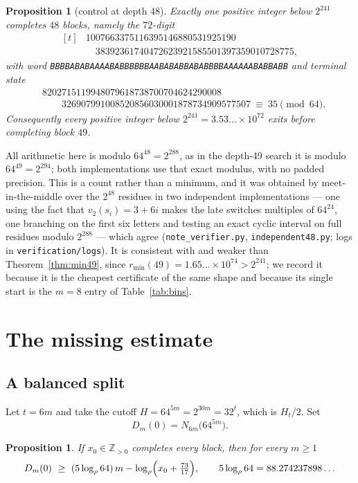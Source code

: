 \documentclass[11pt,a4paper]{article}
\theoremstyle{plain}
\newtheorem{proposition}[theorem]{Proposition}
\theoremstyle{definition}
\theoremstyle{remark}
\newcommand{\Zpos}{\mathbb{Z}_{>0}}
\begin{document}
\begin{proposition}[control at depth 48]\label{prop:48}
Exactly one positive integer below $2^{241}$ completes $48$ blocks, namely the
$72$-digit
\[
\begin{aligned}[t]
&1007663375116395146880531925190\\
&\quad 38392361740472623921585501397359010728775,
\end{aligned}
\]
with word \texttt{BBBBABABAAAABABBBBBBAABABABBABABBBBAAAAAABABBABB} and
terminal state
\begin{align*}
&8202715119948079618738700704624290008\\
&\qquad 326907991008520856030001878734909577507\ \equiv\ 35\pmod{64}.
\end{align*}
Consequently every positive integer below
$2^{241}=3.53\ldots\times 10^{72}$ exits before completing block $49$.
\end{proposition}

All arithmetic here is modulo $64^{48}=2^{288}$, as in the depth-49 search it
is modulo $64^{49}=2^{294}$; both implementations use that exact modulus, with
no padded precision. This is a count rather than a minimum, and it was obtained
by meet-in-the-middle over the $2^{48}$ residues in two independent
implementations --- one using the
fact that $v_2(s_i)=3+6i$ makes the late switches multiples of $64^{24}$, one
branching on the first six letters and testing an exact cyclic interval on full
residues modulo $2^{288}$ --- which agree (\texttt{note\_verifier.py},
\texttt{independent48.py}; logs in \texttt{verification/logs}). It is
consistent with and weaker than Theorem~\ref{thm:min49}, since
$r_{\min}(49)=1.65\ldots\times 10^{74}>2^{241}$; we record it because it is the
cheapest certificate of the same shape and because its single start is the
$m=8$ entry of Table~\ref{tab:bins}.

\section{The missing estimate}

\subsection{A balanced split}

Let $t=6m$ and take the cutoff $H=64^{5m}=2^{30m}=32^{t}$, which is $H_t/2$.
Set
\[
D_m(0)=N_{6m}\bigl(64^{5m}\bigr).
\]

\begin{proposition}\label{prop:nec}
If $x_0\in\Zpos$ completes every block, then for every $m\ge 1$
\begin{equation}\label{eq:nec}
D_m(0)\ \ge\ (5\log_\rho 64)\,m-\log_\rho\Bigl(x_0+\tfrac{73}{17}\Bigr),
\qquad 5\log_\rho 64=88.274237898\ldots
\end{equation}
\end{proposition}
\end{document}
